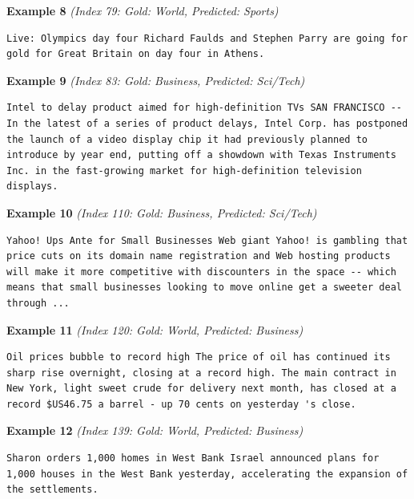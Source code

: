 \noindent
\textbf{Example 8} \quad \textit{(Index 79: Gold: World, Predicted: Sports)}

\begin{Verbatim}[breaklines=true,breakanywhere=true,fontsize=\small]
Live: Olympics day four Richard Faulds and Stephen Parry are going for gold for Great Britain on day four in Athens.
\end{Verbatim}

\noindent
\textbf{Example 9} \quad \textit{(Index 83: Gold: Business, Predicted: Sci/Tech)}

\begin{Verbatim}[breaklines=true,breakanywhere=true,fontsize=\small]
Intel to delay product aimed for high-definition TVs SAN FRANCISCO -- In the latest of a series of product delays, Intel Corp. has postponed the launch of a video display chip it had previously planned to introduce by year end, putting off a showdown with Texas Instruments Inc. in the fast-growing market for high-definition television displays.
\end{Verbatim}

\noindent
\textbf{Example 10} \quad \textit{(Index 110: Gold: Business, Predicted: Sci/Tech)}

\begin{Verbatim}[breaklines=true,breakanywhere=true,fontsize=\small]
Yahoo! Ups Ante for Small Businesses Web giant Yahoo! is gambling that price cuts on its domain name registration and Web hosting products will make it more competitive with discounters in the space -- which means that small businesses looking to move online get a sweeter deal through ...
\end{Verbatim}

\noindent
\textbf{Example 11} \quad \textit{(Index 120: Gold: World, Predicted: Business)}

\begin{Verbatim}[breaklines=true,breakanywhere=true,fontsize=\small]
Oil prices bubble to record high The price of oil has continued its sharp rise overnight, closing at a record high. The main contract in New York, light sweet crude for delivery next month, has closed at a record $US46.75 a barrel - up 70 cents on yesterday 's close.
\end{Verbatim}

\noindent
\textbf{Example 12} \quad \textit{(Index 139: Gold: World, Predicted: Business)}

\begin{Verbatim}[breaklines=true,breakanywhere=true,fontsize=\small]
Sharon orders 1,000 homes in West Bank Israel announced plans for 1,000 houses in the West Bank yesterday, accelerating the expansion of the settlements.
\end{Verbatim}

